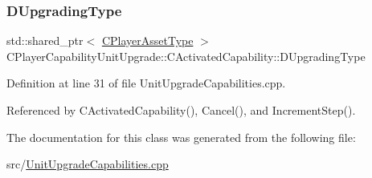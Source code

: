 \hypertarget{classCPlayerCapabilityUnitUpgrade_1_1CActivatedCapability_a028e222f2adc8a1035090487c93b358b}{}\label{classCPlayerCapabilityUnitUpgrade_1_1CActivatedCapability_a028e222f2adc8a1035090487c93b358b} 
\subsubsection{\texorpdfstring{D\+Upgrading\+Type}{DUpgradingType}}
{\footnotesize\ttfamily std\+::shared\+\_\+ptr$<$ \hyperlink{classCPlayerAssetType}{C\+Player\+Asset\+Type} $>$ C\+Player\+Capability\+Unit\+Upgrade\+::\+C\+Activated\+Capability\+::\+D\+Upgrading\+Type\hspace{0.3cm}{\ttfamily [protected]}}



Definition at line 31 of file Unit\+Upgrade\+Capabilities.\+cpp.



Referenced by C\+Activated\+Capability(), Cancel(), and Increment\+Step().



The documentation for this class was generated from the following file\+:\begin{DoxyCompactItemize}
\item 
src/\hyperlink{UnitUpgradeCapabilities_8cpp}{Unit\+Upgrade\+Capabilities.\+cpp}\end{DoxyCompactItemize}
